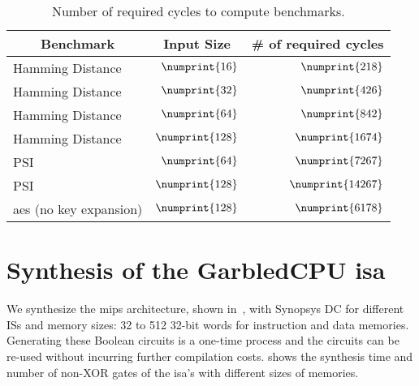 \begin{table}[ht]
\caption{Number of required cycles to compute benchmarks.}\label{tab:cyc_bench}
\centering
\small
\begin{tabular}{l|r|r}
\multicolumn{1}{c|}{Benchmark} & \multicolumn{1}{c|}{Input Size} &  \multicolumn{1}{c}{\# of required cycles} \\
\hline
\hline
Hamming Distance & $\numprint{16}$ & $\numprint{218}$\\
\hline
 Hamming Distance & $\numprint{32}$ & $\numprint{426}$\\
\hline
Hamming Distance & $\numprint{64}$ & $\numprint{842}$\\
\hline
Hamming Distance & $\numprint{128}$ & $\numprint{1674}$\\
\hline
PSI & $\numprint{64}$ &$\numprint{7267}$\\
\hline
PSI & $\numprint{128}$ &$\numprint{14267}$\\
\hline
\acrshort{aes} (no key expansion) & $\numprint{128}$ & $\numprint{6178}$\\
\end{tabular}
\end{table}

\section{Synthesis of the GarbledCPU \acrshort{isa}}
We synthesize the \gls{mips} architecture, shown in~, with Synopsys DC for different ISs and memory sizes: 32 to 512 32-bit words for instruction and data memories. Generating these Boolean circuits is a one-time process and the circuits can be re-used without incurring further compilation costs.  shows the synthesis time and number of non-XOR gates of the \acrshort{isa}'s with different sizes of memories.


